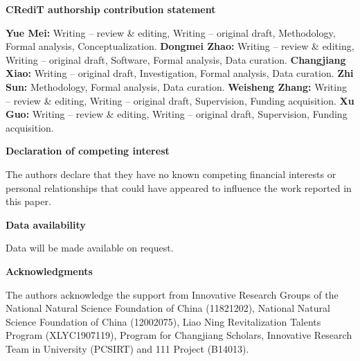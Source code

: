 \documentclass[11pt]{article}
\begin{document}
\noindent\textbf{CRediT authorship contribution statement}

\vspace{0.3em}

\noindent
\textbf{Yue Mei:} Writing -- review \& editing, Writing --
original draft, Methodology, Formal analysis, Conceptualization.
\textbf{Dongmei Zhao:} Writing -- review \& editing, Writing --
original draft, Software, Formal analysis, Data curation.
\textbf{Changjiang Xiao:} Writing -- original draft,
Investigation, Formal analysis, Data curation.
\textbf{Zhi Sun:} Methodology, Formal analysis, Data curation.
\textbf{Weisheng Zhang:} Writing -- review \& editing, Writing
-- original draft, Supervision, Funding acquisition.
\textbf{Xu Guo:} Writing -- review \& editing, Writing --
original draft, Supervision, Funding acquisition.

\vspace{0.5em}

\noindent\textbf{Declaration of competing interest}

\vspace{0.3em}

\noindent
The authors declare that they have no known competing financial
interests or personal relationships that could have appeared to
influence the work reported in this paper.

\vspace{0.5em}

\noindent\textbf{Data availability}

\vspace{0.3em}

\noindent
Data will be made available on request.

\vspace{0.5em}

\noindent\textbf{Acknowledgments}

\vspace{0.3em}

\noindent
The authors acknowledge the support from Innovative Research
Groups of the National Natural Science Foundation of China
(11821202), National Natural Science Foundation of China
(12002075), Liao Ning Revitalization Talents Program
(XLYC1907119), Program for Changjiang Scholars, Innovative
Research Team in University (PCSIRT) and 111 Project (B14013).
\end{document}
